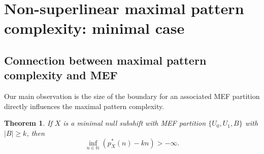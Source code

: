\documentclass[11pt,reqno]{amsart}
\newtheorem{theorem}{Theorem}[section]
\theoremstyle{definition}
\theoremstyle{plain}
\newcommand{\N}{\mathbb{N}}
\begin{document}
\section{Non-superlinear maximal pattern complexity: minimal case}

\subsection{Connection between maximal pattern complexity and MEF}

Our main observation is the size of the boundary for an associated MEF partition directly influences the maximal pattern complexity.


\begin{theorem}\label{main}
If $X$ is a minimal null subshift with MEF partition $\{U_0, U_1, B\}$ with $|B| \geq k$, then 
\[
    \inf_{n \in \N} (p^*_X(n) - kn) > -\infty.
\]
\end{theorem}
\end{document}
